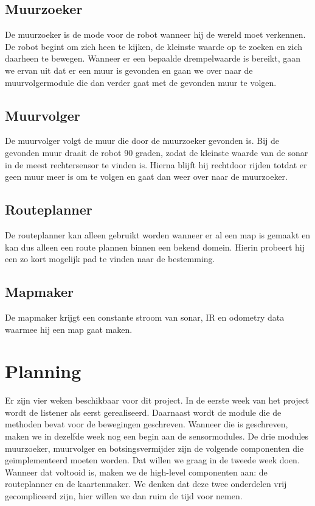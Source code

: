 \documentclass[a4paper,10pt]{article}
\begin{document}
\subsection{Muurzoeker}
De muurzoeker is de mode voor de robot wanneer hij de wereld moet verkennen. De robot begint om zich heen te kijken, de kleinste waarde op te zoeken en zich daarheen te bewegen. Wanneer er een bepaalde drempelwaarde is bereikt, gaan we ervan uit dat er een muur is gevonden en gaan we over naar de muurvolgermodule die dan verder gaat met de gevonden muur te volgen.
\subsection{Muurvolger}
De muurvolger volgt de muur die door de muurzoeker gevonden is. Bij de gevonden muur draait de robot 90 graden, zodat de kleinste waarde van de sonar in de meest rechtersensor te vinden is. Hierna blijft hij rechtdoor rijden totdat er geen muur meer is om te volgen en gaat dan weer over naar de muurzoeker.
\subsection{Routeplanner}
De routeplanner kan alleen gebruikt worden wanneer er al een map is gemaakt en kan dus alleen een route plannen binnen een bekend domein. Hierin probeert hij een zo kort mogelijk pad te vinden naar de bestemming. 
\subsection{Mapmaker}
De mapmaker krijgt een constante stroom van sonar, IR en odometry data waarmee hij een map gaat maken.
\section{Planning}
Er zijn vier weken beschikbaar voor dit project. In de eerste week van het project wordt de listener als eerst gerealiseerd. Daarnaast wordt de module die de methoden bevat voor de bewegingen geschreven. Wanneer die is geschreven, maken we in dezelfde week nog een begin aan de sensormodules. De drie modules muurzoeker, muurvolger en botsingsvermijder zijn de volgende componenten die ge\"{i}mplementeerd moeten worden. Dat willen we graag in de tweede week doen. Wanneer dat voltooid is, maken we de high-level componenten aan: de routeplanner en de kaartenmaker. We denken dat deze twee onderdelen vrij gecompliceerd zijn, hier willen we dan ruim de tijd voor nemen.\\
\end{document}
